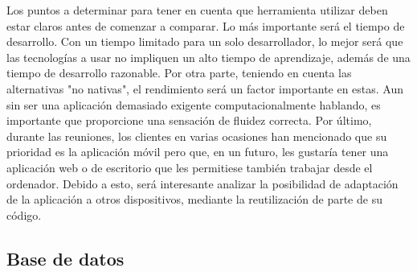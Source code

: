 Los puntos a determinar para tener en cuenta que herramienta utilizar deben estar claros antes de comenzar a comparar. Lo más importante será el tiempo de desarrollo. Con un tiempo limitado para un solo desarrollador, lo mejor será que las tecnologías a usar no impliquen un alto tiempo de aprendizaje, además de una tiempo de desarrollo razonable. Por otra parte, teniendo en cuenta las alternativas "no nativas", el rendimiento será un factor importante en estas. Aun sin ser una aplicación demasiado exigente computacionalmente hablando, es importante que proporcione una sensación de fluidez correcta. Por último, durante las reuniones, los clientes en varias ocasiones han mencionado que su prioridad es la aplicación móvil pero que, en un futuro, les gustaría tener una aplicación web o de escritorio que les permitiese también trabajar desde el ordenador. Debido a esto, será interesante analizar la posibilidad de adaptación de la aplicación a otros dispositivos, mediante la reutilización de parte de su código.

\subsection{Base de datos}

